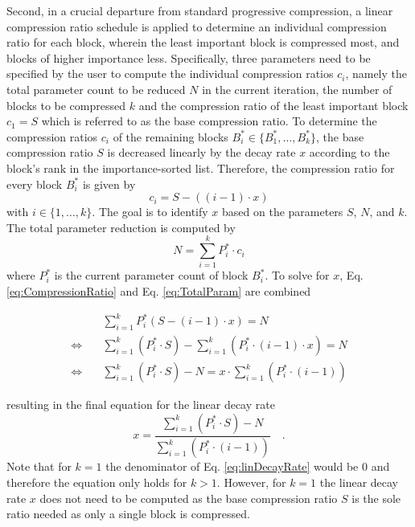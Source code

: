 Second, in a crucial departure from standard progressive compression, a linear compression ratio schedule is applied to determine an individual compression ratio for each block, wherein the least important block is compressed most, and blocks of higher importance less. Specifically, three parameters need to be specified by the user to compute the individual compression ratios $c_i$, namely the total parameter count to be reduced $N$ in the current iteration, the number of blocks to be compressed $k$ and the compression ratio of the least important block $c_1 = S$ which is referred to as the base compression ratio. To determine the compression ratios $c_i$ of the remaining blocks $B_i^* \in \{B^*_1, \dots, B^*_k\}$, the base compression ratio $S$ is decreased linearly by the decay rate $x$ according to the block's rank in the importance-sorted list. Therefore, the compression ratio for every block $B_i^*$ is given by
\begin{equation}
	\label{eq:CompressionRatio}
	c_i = S - ((i-1) \cdot x)
\end{equation}
with $i \in \{1, \dots, k\}$. The goal is to identify $x$ based on the parameters $S$, $N$, and $k$. The total parameter reduction is computed by
\begin{equation}
	\label{eq:TotalParam}
	N = \sum_{i=1}^{k} P^*_i \cdot c_i
\end{equation}
where $P^*_i$ is the current parameter count of block $B_i^*$. To solve for $x$, Eq. \eqref{eq:CompressionRatio} and Eq. \eqref{eq:TotalParam} are combined

\begin{equation}
	\begin{split}
		& \sum_{i=1}^{k} P^*_i (S - (i-1) \cdot x) = N \\
		\Leftrightarrow \quad & \sum_{i=1}^{k} (P^*_i \cdot S) - \sum_{i=1}^{k} (P^*_i \cdot (i-1) \cdot x) = N \\
		\Leftrightarrow \quad & \sum_{i=1}^{k} (P^*_i \cdot S) - N = x \cdot \sum_{i=1}^{k} (P^*_i \cdot (i-1))
	\end{split}
	\label{eq:linear_compression_derivation}
\end{equation}


resulting in the final equation for the linear decay rate
\begin{equation}
	\label{eq:linDecayRate}
	x = \frac{\sum_{i=1}^{k}\left(P^*_i \cdot S \right) - N}{ \sum_{i=1}^{k}\left(P^*_i \cdot (i-1)  \right)} \quad.
\end{equation}
Note that for $k=1$ the denominator of Eq. \eqref{eq:linDecayRate} would be 0 and therefore the equation only holds for $k > 1$. However, for $k=1$ the linear decay rate $x$ does not need to be computed as the base compression ratio $S$ is the sole ratio needed as only a single block is compressed.

